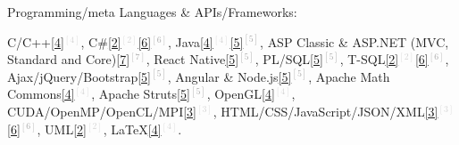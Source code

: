 

\begin{cventries}

\vspace{-0.25cm}

  \cventry
    {Programming/meta Languages \& APIs/Frameworks:} %
    {} %
    {} %
    {} %
    {
      \vspace{0.1cm}     
      \begin{cvitems} %
        \item[] {
		\textcolor{rainbowcolor-indigo}{C/C++\textcolor{lightgray}{\ref{4}{$^{[4]}$}}},
		\textcolor{rainbowcolor-indigo}{C\#\textcolor{lightgray}{\ref{2}{$^{[2]}$}}\textcolor{darkgray}{\ref{6}{$^{[6]}$}}},
		\textcolor{rainbowcolor-indigo}{Java\textcolor{lightgray}{\ref{4}{$^{[4]}$}}\textcolor{darkgray}{\ref{5}{$^{[5]}$}}},
		\textcolor{rainbowcolor-indigo}{ASP Classic \& ASP.NET (MVC, Standard and Core)\textcolor{darkgray}{\ref{7}{$^{[7]}$}}},	
		\textcolor{rainbowcolor-indigo}{React Native\textcolor{darkgray}{\ref{5}{$^{[5]}$}}},		
		\textcolor{rainbowcolor-indigo}{PL/SQL\textcolor{darkgray}{\ref{5}{$^{[5]}$}}},
		\textcolor{rainbowcolor-indigo}{T-SQL\textcolor{lightgray}{\ref{2}{$^{[2]}$}}\textcolor{darkgray}{\ref{6}{$^{[6]}$}}},
		\textcolor{rainbowcolor-indigo}{Ajax/jQuery/Bootstrap\textcolor{darkgray}{\ref{5}{$^{[5]}$}}},
		\textcolor{rainbowcolor-indigo}{Angular %
	    	\& Node.js\textcolor{darkgray}{\ref{5}{$^{[5]}$}}},
        \textcolor{rainbowcolor-indigo}{Apache Math Commons\textcolor{lightgray}{\ref{4}{$^{[4]}$}}},  
	    \textcolor{rainbowcolor-indigo}{Apache Struts\textcolor{darkgray}{\ref{5}{$^{[5]}$}}},
	    \textcolor{rainbowcolor-indigo}{OpenGL\textcolor{lightgray}{\ref{4}{$^{[4]}$}}},
	    \textcolor{rainbowcolor-indigo}{CUDA/OpenMP/OpenCL/MPI\textcolor{lightgray}{\ref{3}{$^{[3]}$}}},
	    \textcolor{rainbowcolor-indigo}{HTML/CSS/JavaScript/JSON/XML\textcolor{lightgray}{\ref{3}{$^{[3]}$}}\textcolor{darkgray}{\ref{6}{$^{[6]}$}}},
	    \textcolor{rainbowcolor-indigo}{UML\textcolor{lightgray}{\ref{2}{$^{[2]}$}}},
	    \textcolor{rainbowcolor-indigo}{LaTeX\textcolor{lightgray}{\ref{4}{$^{[4]}$}}}.
	    }
	  \end{cvitems}
    }  


\end{cventries}
